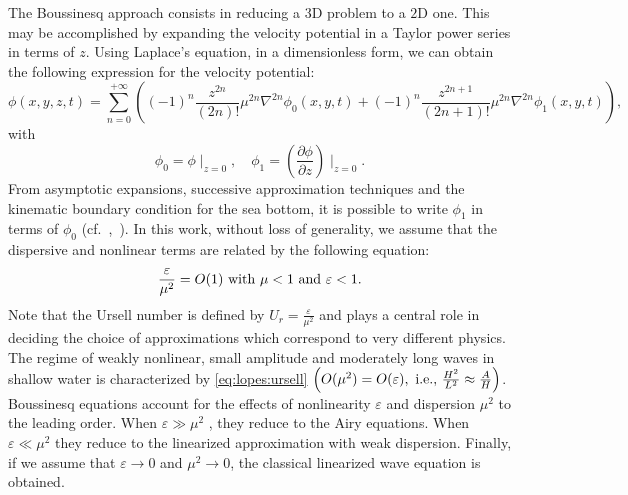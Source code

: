 The Boussinesq approach consists in reducing a $3$D problem
to a $2$D one.  This may be accomplished by expanding the
velocity potential in a Taylor power series in terms of $z$.
Using Laplace's equation, in a dimensionless form, we can
obtain the following expression for the velocity potential:
\begin{equation}
\phi(x,y,z,t)=\sum_{n=0}^{+\infty}\left((-1)^n\frac{z^{2n}}{(2n)!}\mu^{2n}\nabla^{2n}\phi_0(x,y,t)+
(-1)^n
\frac{z^{2n+1}}{(2n+1)!}\mu^{2n}\nabla^{2n}\phi_1(x,y,t)\right),
\end{equation}
with
\begin{equation}
\phi_0=\phi\mid_{ z=0},\quad
\phi_1=\left(\frac{\partial \phi}{\partial z}\right)\mid_{z=0}\!.
\end{equation}
From asymptotic expansions, successive approximation
techniques and the kinematic boundary condition for the sea
bottom, it is possible to write $\phi_1$ in terms of
$\phi_0$ (cf.~\cite{ChenLiu1994},~\cite{ZhaoTengCheng2004}).
In this work, without loss of generality, we assume that the
dispersive and nonlinear terms are related by the following
equation:
\begin{equation}\label{eq:lopes:ursell}
\frac{\varepsilon}{\mu^2}=O(1)\ {\rm with}\ \mu<1\ {\rm
  and}\ \varepsilon<1.
\end{equation}
Note that the Ursell number is defined by $\displaystyle
U_r=\frac{\varepsilon}{\mu^2}$ and plays a central role in
deciding the choice of approximations which correspond to
very different physics.  The regime of weakly nonlinear,
small amplitude and moderately long waves in shallow water
is characterized by \eqref{eq:lopes:ursell}
$\left(O(\mu^2)=O(\varepsilon), {\ \rm i.e.,\ }
\frac{H^2}{L^2}\approx\frac{A}{H} \right)$.  Boussinesq
equations account for the effects of nonlinearity
$\varepsilon$ and dispersion $\mu^2$ to the leading order.
When $\varepsilon\gg \mu^2$ , they reduce to the Airy
equations.  When $\varepsilon\ll \mu^2$ they reduce to the
linearized approximation with weak dispersion.  Finally, if
we assume that $\varepsilon\rightarrow 0$ and
$\mu^2\rightarrow 0$, the classical linearized wave equation
is obtained.

